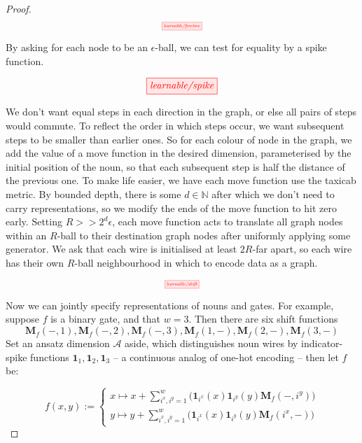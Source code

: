 \begin{fullwidth}
\begin{theorem}
\begin{proof}
\[\scalebox{0.5}{\tikzfig{learnable/freetree}}\]

By asking for each node to be an $\epsilon$-ball, we can test for equality by a spike function.

\[\scalebox{1}{\tikzfig{learnable/spike}}\]

We don't want equal steps in each direction in the graph, or else all pairs of steps would commute. To reflect the order in which steps occur, we want subsequent steps to be smaller than earlier ones. So for each colour of node in the graph, we add the value of a move function in the desired dimension, parameterised by the initial position of the noun, so that each subsequent step is half the distance of the previous one. To make life easier, we have each move function use the taxicab metric. By bounded depth, there is some $d \in \mathbb{N}$ after which we don't need to carry representations, so we modify the ends of the move function to hit zero early. Setting $R >> 2^d \epsilon$, each move function acts to translate all graph nodes within an $R$-ball to their destination graph nodes after uniformly applying some generator. We ask that each wire is initialised at least $2R$-far apart, so each wire has their own $R$-ball neighbourhood in which to encode data as a graph. 

\[\scalebox{0.5}{\tikzfig{learnable/shift}}\]

Now we can jointly specify representations of nouns and gates. For example, suppose $f$ is a binary gate, and that $w=3$. Then there are six shift functions $$\mathbf{M}_f(-,1),\mathbf{M}_f(-,2),\mathbf{M}_f(-,3),\mathbf{M}_f(1,-),\mathbf{M}_f(2,-),\mathbf{M}_f(3,-)$$ Set an ansatz dimension $\mathcal{A}$ aside, which distinguishes noun wires by indicator-spike functions $\mathbf{1}_{1},\mathbf{1}_{2},\mathbf{1}_{3}$ -- a continuous analog of one-hot encoding -- then let $f$ be:

\[f(x,y) := \begin{cases}
x \mapsto x + \sum\limits^{w}_{i^x,i^y =1}\big(\mathbf{1}_{i^x}(x)\mathbf{1}_{i^y}(y) \mathbf{M}_f(-,i^y)  \big) \\
y \mapsto y + \sum\limits^{w}_{i^x,i^y =1}\big(\mathbf{1}_{i^x}(x)\mathbf{1}_{i^y}(y) \mathbf{M}_f(i^x,-)  \big)
\end{cases}
\]


\end{proof}
\end{theorem}
\end{fullwidth}
